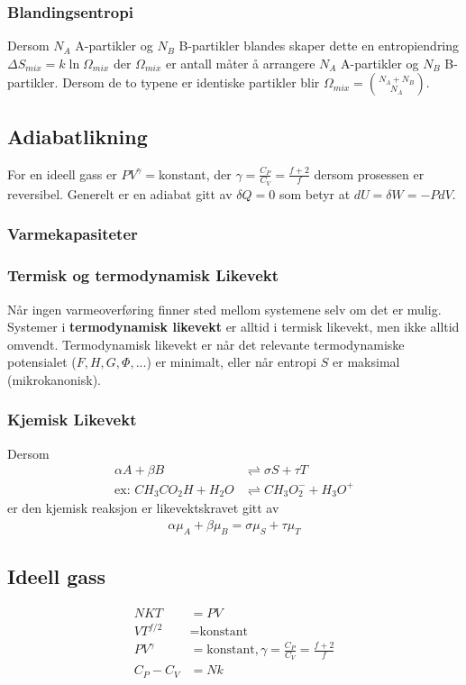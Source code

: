\documentclass[a4paper, norsk, 10pt]{article}
\newcommand{\EQU}[1] { \begin{equation*} \begin{split}
#1  
\end{split} \end{equation*} }
\begin{document}
\begin{multicols*}{2}
\subsubsection*{Blandingsentropi}
Dersom $N_A$ A-partikler og $N_B$ B-partikler blandes skaper dette en entropiendring
$ \Delta S_{mix} = k\ln \Omega_{mix} $
der $\Omega_{mix}$ er antall måter å arrangere $N_A$ A-partikler og  $N_B$ B-partikler. Dersom de to typene er identiske partikler blir $\Omega_{mix}=\binom{N_A+N_B}{N_A}$.

\subsection*{Adiabatlikning}
For en ideell gass er $PV^\gamma = $konstant, der $\gamma=\frac{C_P}{C_V}=\frac{f+2}{f}$ dersom prosessen er reversibel. Generelt er en adiabat gitt av $\delta Q=0$ som betyr at $dU=\delta W = -PdV$.

\subsubsection*{Varmekapasiteter}



\subsubsection*{Termisk og termodynamisk Likevekt}
Når ingen varmeoverføring finner sted mellom systemene selv om det er mulig. Systemer i \textbf{termodynamisk likevekt} er alltid i termisk likevekt, men ikke alltid omvendt. Termodynamisk likevekt er når det relevante termodynamiske potensialet ($F,H,G,\Phi,...$) er minimalt, eller når entropi $S$ er maksimal (mikrokanonisk).

\subsubsection*{Kjemisk Likevekt}
Dersom 
\EQU{
\alpha A + \beta B &\rightleftharpoons \sigma S + \tau T \\
 \text{ex: } CH_3CO_2H+H_2O &\rightleftharpoons CH_3 O_2^-+H_3O^+ 
}
er den kjemisk reaksjon er likevektskravet gitt av
\EQU{
\alpha \mu_A + \beta \mu_B = \sigma \mu_S + \tau \mu_T
}

\subsection*{Ideell gass}
\EQU{
NKT&=PV \\
VT^{f/2} &= \text{konstant} \\
PV^\gamma &= \text{konstant}, \gamma = \frac{C_P}{C_V} = \frac{f+2}{f} \\
C_P-C_V &= Nk
}



\end{multicols*}
\end{document}
